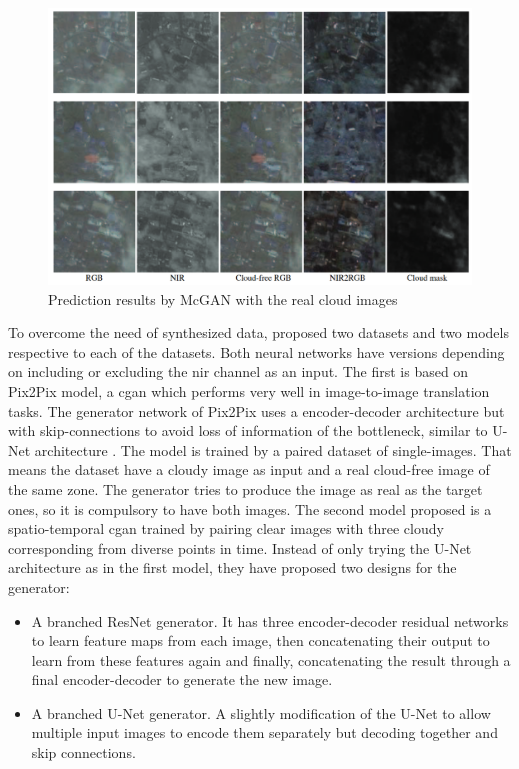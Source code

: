 \documentclass[../main.tex]{subfiles}
\begin{document}
\begin{figure}[H]
	\centering
	\includegraphics[width=12cm]{imgs/relatedwork/mcgan-real.png}
	\caption{Prediction results by McGAN with the real cloud images}
	\label{fig:related-mcgan-real}
\end{figure}
To overcome the need of synthesized data, \cite{sarukkai2019cloud} proposed two datasets and two models respective to each of the datasets. Both neural networks have versions depending on including or excluding the \gls{nir} channel as an input. The first is based on Pix2Pix \cite{pix2pix2017} model, a \gls{cgan} which performs very well in image-to-image translation tasks. The generator network of Pix2Pix  uses a encoder-decoder architecture but with skip-connections to avoid loss of information of the bottleneck, similar to U-Net architecture \cite{unet}. The model is trained by a paired dataset of single-images. That means the dataset have a cloudy image as input and a real cloud-free image of the same zone. The generator tries to produce the image as real as the target ones, so it is compulsory to have both images.  The second model proposed is a spatio-temporal \gls{cgan} trained by pairing clear images with three cloudy corresponding from diverse points in time. Instead of only trying the U-Net architecture as in the first model, they have proposed two designs for the generator:
\begin{itemize}
	\item A branched ResNet generator. It has three encoder-decoder residual networks to learn feature maps from each image, then concatenating their output to learn from these features again and finally, concatenating the result through a final encoder-decoder to generate the new image.
	\item A branched U-Net generator. A slightly modification of the U-Net to allow multiple input images to encode them separately but decoding together and skip connections.
\end{itemize}
\end{document}
